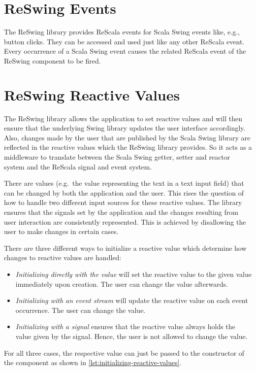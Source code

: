 \documentclass{scrartcl}
\begin{document}
\section{ReSwing Events}
\label{sec:events}
The ReSwing library provides ReScala events for Scala Swing events like, e.g., button clicks. They can be accessed and used just like any other ReScala event. Every occurrence of a Scala Swing event causes the related ReScala event of the ReSwing component to be fired.

\section{ReSwing Reactive Values}
\label{sec:reactive-values}
The ReSwing library allows the application to set reactive values and will then ensure that the underlying Swing library updates the user interface accordingly. Also, changes made by the user that are published by the Scala Swing library are reflected in the reactive values which the ReSwing library provides. So it acts as a middleware to translate between the Scala Swing getter, setter and reactor system and the ReScala signal and event system.

There are values (e.g.\ the value representing the text in a text input field) that can be changed by both the application and the user. This rises the question of how to handle two different input sources for these reactive values. The library ensures that the signals set by the application and the changes resulting from user interaction are consistently represented. This is achieved by disallowing the user to make changes in certain cases.

There are three different ways to initialize a reactive value which determine how changes to reactive values are handled:
\begin{itemize}
\item\emph{Initializing directly with the value} will set the reactive value to the given value immediately upon creation. The user can change the value afterwards.
\item\emph{Initializing with an event stream} will update the reactive value on each event occurrence. The user can change the value.
\item\emph{Initializing with a signal} ensures that the reactive value always holds the value given by the signal. Hence, the user is not allowed to change the value.
\end{itemize}

For all three cases, the respective value can just be passed to the constructor of the component as shown in \cref{lst:initializing-reactive-values}.
\end{document}
